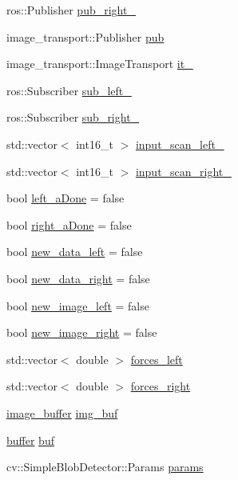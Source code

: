 \begin{DoxyCompactItemize}
ros\-::\-Publisher \hyperlink{class_d_e_c_o_m_p_r_e_s_s_e_r_aa40c8497ac3ee01dff392f6568dadc85}{pub\-\_\-right\-\_\-}
\item 
image\-\_\-transport\-::\-Publisher \hyperlink{class_d_e_c_o_m_p_r_e_s_s_e_r_a105ecd49becc435a09962b745617c4a8}{pub}
\item 
image\-\_\-transport\-::\-Image\-Transport \hyperlink{class_d_e_c_o_m_p_r_e_s_s_e_r_afb78a3024809463300b5909e1c00aa2f}{it\-\_\-}
\item 
ros\-::\-Subscriber \hyperlink{class_d_e_c_o_m_p_r_e_s_s_e_r_a8e49925bbb0afc939e26af6d72d8af02}{sub\-\_\-left\-\_\-}
\item 
ros\-::\-Subscriber \hyperlink{class_d_e_c_o_m_p_r_e_s_s_e_r_a09941b5967e1aa1bb182ad155bc5fb46}{sub\-\_\-right\-\_\-}
\item 
std\-::vector$<$ int16\-\_\-t $>$ \hyperlink{class_d_e_c_o_m_p_r_e_s_s_e_r_a170670afc3d63870f74dc97eb38ed1ab}{input\-\_\-scan\-\_\-left\-\_\-}
\item 
std\-::vector$<$ int16\-\_\-t $>$ \hyperlink{class_d_e_c_o_m_p_r_e_s_s_e_r_a8a8f54b17159575afe94a6a19507a04a}{input\-\_\-scan\-\_\-right\-\_\-}
\item 
bool \hyperlink{class_d_e_c_o_m_p_r_e_s_s_e_r_a0cc04e7a8c2f6d84c3d8791d3a2e8922}{left\-\_\-a\-Done} = false
\item 
bool \hyperlink{class_d_e_c_o_m_p_r_e_s_s_e_r_a6ebe4ab2dc19da34d1c2124dd3d3932e}{right\-\_\-a\-Done} = false
\item 
bool \hyperlink{class_d_e_c_o_m_p_r_e_s_s_e_r_adb166bd562b2186a485976147aab8b1d}{new\-\_\-data\-\_\-left} = false
\item 
bool \hyperlink{class_d_e_c_o_m_p_r_e_s_s_e_r_a3a5164ed608e08edc80d29595d0db2a0}{new\-\_\-data\-\_\-right} = false
\item 
bool \hyperlink{class_d_e_c_o_m_p_r_e_s_s_e_r_a965756ee113264c19b5e409a3c0b28bd}{new\-\_\-image\-\_\-left} = false
\item 
bool \hyperlink{class_d_e_c_o_m_p_r_e_s_s_e_r_a207d9f29b337fec4909dbaf8fced8d5d}{new\-\_\-image\-\_\-right} = false
\item 
std\-::vector$<$ double $>$ \hyperlink{class_d_e_c_o_m_p_r_e_s_s_e_r_a2ebd76248d2f3b00ba748df990aee2e9}{forces\-\_\-left}
\item 
std\-::vector$<$ double $>$ \hyperlink{class_d_e_c_o_m_p_r_e_s_s_e_r_accfe1081e8158a1f9e14c9b9a5603fa0}{forces\-\_\-right}
\item 
\hyperlink{struct_d_e_c_o_m_p_r_e_s_s_e_r_1_1image__buffer}{image\-\_\-buffer} \hyperlink{class_d_e_c_o_m_p_r_e_s_s_e_r_aa2f14d52d18801d9477045b36c3a2b4c}{img\-\_\-buf}
\item 
\hyperlink{struct_d_e_c_o_m_p_r_e_s_s_e_r_1_1buffer}{buffer} \hyperlink{class_d_e_c_o_m_p_r_e_s_s_e_r_a58ccbfc79c1a69cc6947ad3dca223b56}{buf}
\item 
cv\-::\-Simple\-Blob\-Detector\-::\-Params \hyperlink{class_d_e_c_o_m_p_r_e_s_s_e_r_a30cbd1fd3ec1f2a2fcc8b3f33dd34ad1}{params}
\end{DoxyCompactItemize}


